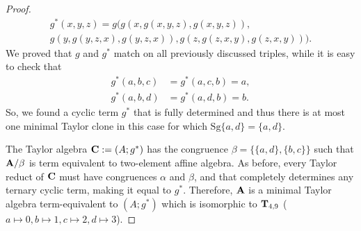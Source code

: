 \documentclass[11pt]{amsart}
\newcommand{\m}[1]{\mathbf{\uppercase{#1}}}
\theoremstyle{definition}
\theoremstyle{remark}
\theoremstyle{plain}
\begin{document}
\begin{proof}
$$
\begin{gathered}
g^*(x,y,z)=g(g(x,g(x,y,z),g(x,y,z)),\\
g(y,g(y,z,x),g(y,z,x)),g(z,g(z,x,y),g(z,x,y))).
\end{gathered}
$$
We proved that $g$ and $g^*$ match on all previously discussed triples, while it is easy to check that 
\begin{align*}
    g^*(a,b,c)&=g^*(a,c,b)=a,\\
    g^*(a,b,d)&=g^*(a,d,b)=b.
\end{align*}
So, we found a cyclic term $g^*$ that is fully determined and thus there is at most one minimal Taylor clone in this case for which $\mathrm{Sg}\{a,d\}=\{a,d\}$.

The Taylor algebra $\m c:=(A;g^*)$ has the congruence $\beta=\{\{a,d\},\{b,c\}\}$ such that $\m a/\beta$ is term equivalent to two-element affine algebra. As before, every Taylor reduct of $\m c$ must have congruences $\alpha$ and $\beta$, and that completely determines any ternary cyclic term, making it equal to $g^*$. Therefore, $\m a$ is a minimal Taylor algebra term-equivalent to $(A;g^*)$ which is isomorphic to $\m t_{4,9}$ ($a\mapsto 0, b\mapsto 1, c\mapsto 2, d\mapsto 3$).


\end{proof}
\end{document}
